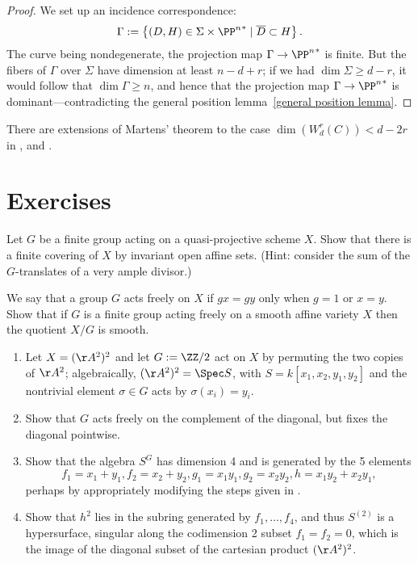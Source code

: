 \begin{proof}
We set up an incidence correspondence: 
$$
\Gamma := \left\{ (D, H) \in \Sigma \times {\PP^n}^* \mid \overline D \subset H \right\}.
$$
The curve being nondegenerate, the projection map $\Gamma \to  {\PP^n}^*$ is finite. But the fibers of $\Gamma$ over $\Sigma$ have dimension at least $n-d+r$; if we had $\dim \Sigma \geq d-r$, it would follow that $\dim \Gamma \geq n$, and hence that the projection map $\Gamma \to  {\PP^n}^*$ is dominant---contradicting the general position lemma~\ref{general position lemma}.
\end{proof}

There are extensions of Martens' theorem to the case $\dim(W^r_d(C)) < d-2r$ in \cite{Mumford-Prym1} \cite{Keem},
and \cite{Coppens}.

\section{Exercises}

\begin{exercise}
 Let $G$ be a finite group acting on a quasi-projective scheme $X$. Show that there is a finite covering of $X$ by invariant open affine sets. (Hint: consider the sum of the $G$-translates of a very ample divisor.)
\end{exercise}

\begin{exercise}\label{free actions}
We say that a group $G$ acts freely on $X$ if $gx = gy$ only when $g =1$ or $x=y$. Show that
 if $G$ is a finite group acting freely on a smooth affine variety $X$ then the quotient $X/G$ is smooth.
\end{exercise}

\begin{exercise}
 \label{sym2A2} 
 \begin{enumerate}
 \item Let $X = (\AA^{2})^{2}$ and let $G := \ZZ/2$ act on $X$ by permuting the two copies of  $\AA^{2}$; algebraically,
$(\AA^{2})^{2} = \Spec S$, with $S = k[x_{1},x_{2}, y_{1}, y_{2}]$ and the nontrivial element $\sigma\in G$ acts by
$\sigma(x_{i}) = y_{i}$. 
\item Show that $G$ acts freely on the complement of the diagonal, but fixes the diagonal pointwise.
\item Show that the algebra $S^{G}$ has dimension 4 and is generated by the 5 elements
$$ 
f_{1} = x_{1}+y_{1}, f_{2} = x_{2}+y_{2}, g_{1} = x_{1}y_{1}, g_{2} = x_{2}y_{2}, h = x_{1}y_{2}+x_{2}y_{1},
$$
perhaps by appropriately modifying the steps given in \cite[Exercise 1.6]{Eisenbud1995}. 
\item Show that $h^2$ lies in the subring generated by $f_1,\dots, f_4$, and thus $S^{(2)}$ is a hypersurface, singular
along the  codimension 2 subset $f_{1} = f_{2} = 0$, which is the image of the diagonal subset of the 
cartesian product $(\AA^{2})^{2}$.
\end{enumerate}
\end{exercise}

